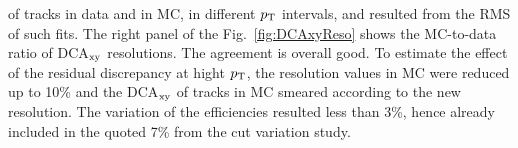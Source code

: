 of tracks in data and in MC, in different $p_{\rm T}$ intervals, and resulted from the RMS of
such fits. The right panel of the Fig.~\ref{fig:DCAxyReso} shows the 
MC-to-data ratio of DCA$_{\rm xy}$ resolutions. 
The agreement is overall good. To estimate the effect of the residual discrepancy at hight $p_{\rm T}$,
the resolution values in MC were reduced up to 10\% and the
DCA$_{\rm xy}$ of tracks in MC smeared according to the new resolution.
The variation of the efficiencies resulted less than 3\%, hence
already included in the quoted 7\% from the cut variation study.

